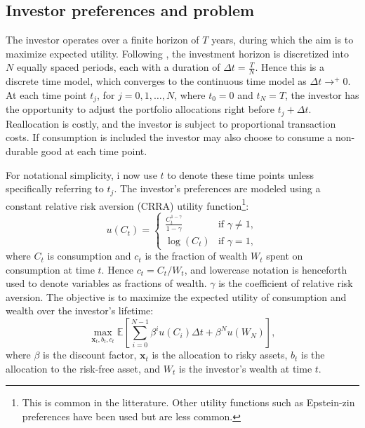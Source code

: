 \documentclass[11pt]{article}
\begin{document}
\subsection{Investor preferences and problem} \label{Subsection: Investor-Preferences}
The investor operates over a finite horizon of \(T\) years, during which the aim is to maximize expected utility. 
Following \textcite{CaiJuddXu2013}, the investment horizon is discretized into \(N\) equally spaced periods, 
each with a duration of \(\Delta t = \frac{T}{N}\). Hence this is a discrete time model, which converges to the continuous time model as \(\Delta t \to^{+} 0\).
At each time point \(t_j\), for \(j = 0, 1, \dots, N\), where \(t_0 = 0\) and \(t_N = T\), 
the investor has the opportunity to adjust the portfolio allocations right before \(t_j + \Delta t\). 
Reallocation is costly, and the investor is subject to proportional transaction costs. 
If consumption is included the investor may also choose to consume a non-durable good at each time point.

For notational simplicity, i now use \(t\) to denote these time points unless specifically referring to \(t_j\). 
The investor's preferences are modeled using a constant relative risk aversion (CRRA) utility function\footnote{This is common in the litterature. Other utility functions such as Epstein-zin preferences have been used but are less common.}: 
\begin{equation}\label{eq:CRRA_Utility}
    u(C_t) = \begin{cases}
                \frac{C_t^{1-\gamma}}{1-\gamma} & \text{if } \gamma \neq 1, \\
                \log(C_t) & \text{if } \gamma = 1,
              \end{cases}
\end{equation}
where \(C_t\) is consumption and \(c_t\) is the fraction of wealth $W_t$ spent on consumption at time \(t\). Hence $c_t = C_t / W_t$,
and lowercase notation is henceforth used to denote variables as fractions of wealth. 
\(\gamma\) is the coefficient of relative risk aversion. 
The objective is to maximize the expected utility of consumption and wealth over the investor's lifetime:
\begin{equation}
  \label{eq:Expected_Utility}
  \max_{\mathbf{x}_t, b_t, c_t} \mathbb{E} \left[ \sum^{N-1}_{i=0} \beta^{i} u(C_i) \Delta t + \beta^N u(W_N) \right],
\end{equation}
where \(\beta\) is the discount factor, \(\mathbf{x}_t\) is the allocation to risky assets, \(b_t\) is the allocation to the risk-free asset, and \(W_t\) is the investor's wealth at time \(t\).
\end{document}
